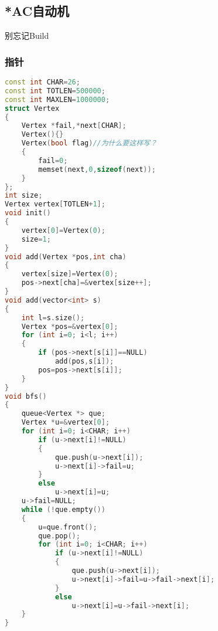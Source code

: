\subsection{*AC自动机}
	别忘记Build
	\subsubsection{指针}
		\begin{lstlisting}[language=c++]
const int CHAR=26;
const int TOTLEN=500000;
const int MAXLEN=1000000;
struct Vertex
{
	Vertex *fail,*next[CHAR];
	Vertex(){}
	Vertex(bool flag)//为什么要这样写？
	{
		fail=0;
		memset(next,0,sizeof(next));
	}
};
int size;
Vertex vertex[TOTLEN+1];
void init()
{
	vertex[0]=Vertex(0);
	size=1;
}
void add(Vertex *pos,int cha)
{
	vertex[size]=Vertex(0);
	pos->next[cha]=&vertex[size++];
}
void add(vector<int> s)
{
	int l=s.size();
	Vertex *pos=&vertex[0];
	for (int i=0; i<l; i++)
	{
		if (pos->next[s[i]]==NULL)
			add(pos,s[i]);
		pos=pos->next[s[i]];
	}
}
void bfs()
{
	queue<Vertex *> que;
	Vertex *u=&vertex[0];
	for (int i=0; i<CHAR; i++)
		if (u->next[i]!=NULL)
		{
			que.push(u->next[i]);
			u->next[i]->fail=u;
		}
		else
			u->next[i]=u;
	u->fail=NULL;
	while (!que.empty())
	{
		u=que.front();
		que.pop();
		for (int i=0; i<CHAR; i++)
			if (u->next[i]!=NULL)
			{
				que.push(u->next[i]);
				u->next[i]->fail=u->fail->next[i];
			}
			else
				u->next[i]=u->fail->next[i];
	}
}
		\end{lstlisting}
